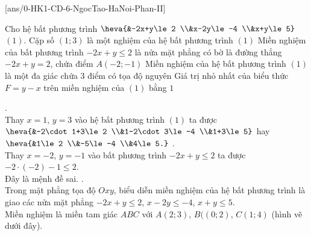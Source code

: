 \cauds
{}[ans/0-HK1-CD-6-NgocTao-HaNoi-Phan-II]
\setcounter{ex}{0}
\begin{ex}%
Cho hệ bất phương trình $\heva {&-2x+y\le 2 \\&x-2y\le -4 \\&x+y\le 5}$\quad $(1)$.
\choiceTF
{\True Cặp số $(1;3)$ là một nghiệm của hệ bất phương trình $(1)$}
{Miền nghiệm của bất phương trình $-2x+y\le 2$ là nửa mặt phẳng có bờ là đường thẳng $-2x+y=2$, chứa điểm $A(-2;-1)$}
{Miền nghiệm của hệ bất phương trình $(1)$ là một đa giác chứa $3$ điểm có tọa độ nguyên}
{\True Giá trị nhỏ nhất của biểu thức $F=y-x$ trên miền nghiệm của $(1)$ bằng $1$}
\loigiai
{\begin{itemchoice}
.\\
Thay $x=1$, $y=3$ vào hệ bất phương trình $(1)$ ta được\\
$\heva {&-2\cdot 1+3\le 2 \\&1-2\cdot 3\le -4 \\&1+3\le 5}$ hay $\heva {&1\le 2 \\&-5\le -4 \\&4\le 5.}$
.\\
Thay $x=-2$, $y=-1$ vào bất phương trình $-2x+y\le 2$ ta được	$-2\cdot (-2) - 1 \le 2$. \\Đây là mệnh đề sai.
.\\
Trong mặt phẳng tọa độ $Oxy$, biểu diễn miền nghiệm của hệ bất phương trình là giao các nửa mặt phẳng $-2x+y\le 2$, $x-2y\le -4$, $x+y\le 5$.\\
Miền nghiệm là miền tam giác $ABC$ với $A(2;3)$, $B((0;2)$, $C(1;4)$ (hình vẽ dưới đây).
\begin{center}
\end{center}
\end{itemchoice}}
\end{ex}
